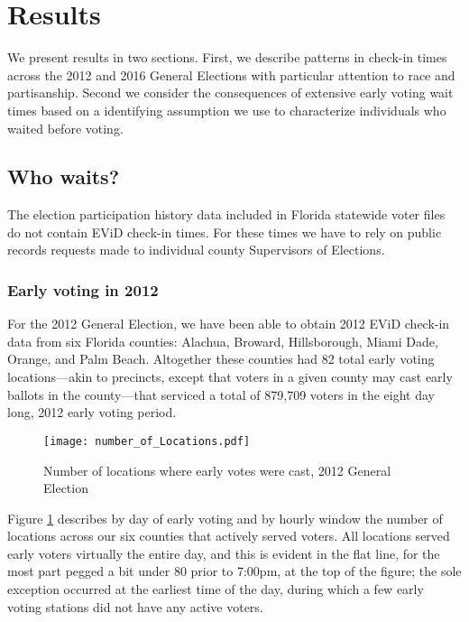 \documentclass[12pt,titlepage]{article}
\begin{document}
\section*{Results}

We present results in two sections.  First, we describe patterns in
check-in times across the 2012 and 2016 General Elections with
particular attention to race and partisanship.  Second we consider the
consequences of extensive early voting wait times based on a
identifying assumption we use to characterize individuals who waited
before voting.

\subsection*{Who waits?}

The election participation history data included in Florida statewide
voter files do not contain EViD check-in times.  For these times we
have to rely on public records requests made to individual county
Supervisors of Elections.

\subsubsection*{Early voting in 2012}

For the 2012 General Election, we have been able to obtain 2012 EViD
check-in data from six Florida counties: Alachua, Broward,
Hillsborough, Miami Dade, Orange, and Palm Beach.  Altogether these
counties had 82 total early voting locations---akin to precincts,
except that voters in a given county may cast early ballots in the
county---that serviced a total of 879,709 voters in the eight day
long, 2012 early voting
period.  %



\begin{figure}[!ht]
  \caption{Number of locations where early votes were cast, 2012
    General Election}
  \label{fig:nrlocs2012}
  \centering
    \centering\texttt{[image: number\_of\_Locations.pdf]}
\end{figure}

Figure \ref{fig:nrlocs2012} describes by day of early voting and by
hourly window the number of locations across our six counties that
actively served voters.  All locations served early voters virtually
the entire day, and this is evident in the flat line, for the most
part pegged a bit under 80 prior to 7:00pm, at the top of the figure;
the sole exception occurred at the earliest time of the day, during
which a few early voting stations did not have any active voters.
\end{document}
